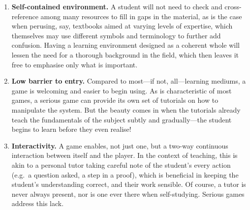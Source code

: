 \documentclass[a4paper]{article}
\begin{document}
\begin{enumerate}
\begin{itemize}
      \begin{itemize}
        \item {}
        \item {}
        \item {}
      \end{itemize}
    \end{itemize}
  \item \textbf{Self-contained environment.} A student will not need to check and cross-reference among many resources to fill in gaps in the material, as is the case when perusing, say, textbooks aimed at varying levels of expertise, which themselves may use different symbols and terminology to further add confusion. Having a learning environment designed as a coherent whole will lessen the need for a thorough background in the field, which then leaves it free to emphasise only what is important.
  \item \textbf{Low barrier to entry.} Compared to most---if not, all---learning mediums, a game is welcoming and easier to begin using. As is characteristic of most games, a serious game can provide its own set of tutorials on how to manipulate the system. But the beauty comes in when the tutorials already teach the fundamentals of the subject subtly and gradually---the student begins to learn before they even realise!
  \item \textbf{Interactivity.} A game enables, not just one, but a two-way continuous interaction between itself and the player. In the context of teaching, this is akin to a personal tutor taking careful note of the student's every action (e.g.\ a question asked, a step in a proof), which is beneficial in keeping the student's understanding correct, and their work sensible. Of course, a tutor is never always present, nor is one ever there when self-studying. Serious games address this lack.

\end{enumerate}
\end{document}
